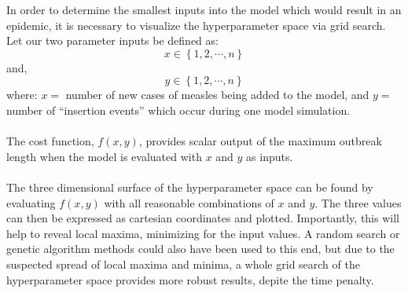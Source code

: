 \documentclass[../Paper.tex]{subfiles}
\begin{document}
  In order to determine the smallest inputs into the model which would result in
  an epidemic, it is necessary to visualize the hyperparameter space via grid search.
  \\
  Let our two parameter inputs be defined as:
  \begin{equation}
    x \in \left\{1, 2, \cdots, n \right\}
  \end{equation}
  and,
  \begin{equation}
    y \in \left\{1, 2, \cdots, n \right\}
  \end{equation}
  where: $x =$ number of new cases of measles being added to the model, and
  $y =$ number of ``insertion events'' which occur during one model simulation.\\
  \\
  The cost function, $f(x, y)$, provides scalar output of the maximum outbreak length
  when the model is evaluated with $x$ and $y$ as inputs.\\
  \\
  The three dimensional surface of the hyperparameter space can be found by evaluating $f(x,y)$
  with all reasonable combinations of $x$ and $y$. The three values can then be
  expressed as cartesian coordinates and plotted. Importantly, this will help to reveal
  local maxima, minimizing for the input values. A random search or
  genetic algorithm methods could also have been used to this end, but due to the
  suspected spread of local maxima and minima, a whole grid search of the
  hyperparameter space provides more robust results, depite the time penalty.
  \\
  
  \clearpage
\end{document}
